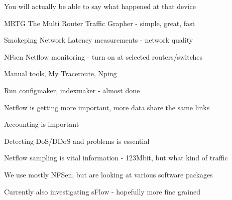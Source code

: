 \documentclass[28pt,landscape,a4paper,footrule]{foils}
\begin{document}
\centerline{You will actually be able to say what happened at that device}


\begin{slidelist}
\item MRTG The Multi Router Traffic Grapher - simple, great, fast\\
\item Smokeping Network Latency measurements - network quality\\
\item NFsen Netflow monitoring - turn on at selected routers/switches
\item Manual tools, My Traceroute, Nping
\end{slidelist}



\centerline{Run configmaker, indexmaker - almost done}






\begin{slidelist}
\item Netflow is getting more important, more data share the same links
\item Accounting is important
\item Detecting DoS/DDoS and problems is essential
\item Netflow sampling is vital information - 123Mbit, but what kind of traffic 
\item We use mostly NFSen, but are looking at various software packages
\item Currently also investigating sFlow - hopefully more fine grained
\end{slidelist}





\end{document}
